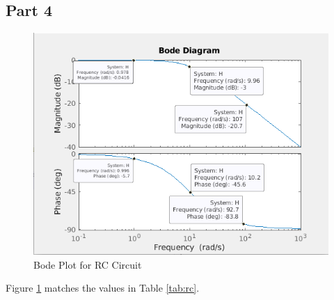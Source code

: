 \documentclass[12pt]{article}
\begin{document}
		\subsection{Part 4}
		\begin{figure}[H]
			\centering
			\includegraphics[width=1\linewidth]{"Code/Fig/prelab_bode_label.png"}
			\caption{Bode Plot for RC Circuit}
			\label{fig:bode}
		\end{figure}
		Figure \ref{fig:bode} matches the values in Table \ref{tab:rc}. 
		\newpage
\end{document}
